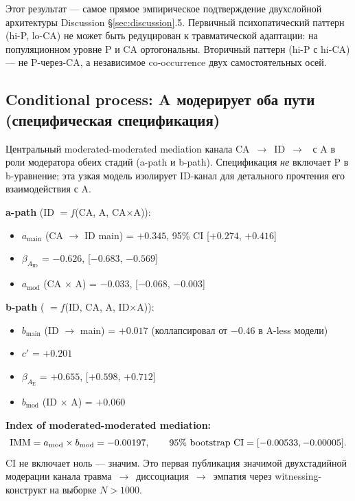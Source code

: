 Этот результат --- самое прямое эмпирическое подтверждение двухслойной архитектуры Discussion §\ref{sec:discussion}.5. Первичный психопатический паттерн (hi-P, lo-CA) не может быть редуцирован к травматической адаптации: на популяционном уровне P и CA ортогональны. Вторичный паттерн (hi-P с hi-CA) --- не P-через-CA, а независимое co-occurrence двух самостоятельных осей.

\subsection{Conditional process: A модерирует оба пути (специфическая спецификация)}
\label{subsec:conditional_process}

Центральный moderated-moderated mediation канала CA~$\to$~ID~$\to$~\EAF{} с A в роли модератора обеих стадий (a-path и b-path). Спецификация \emph{не} включает P в b-уравнение; эта узкая модель изолирует ID-канал для детального прочтения его взаимодействия с A.

\textbf{a-path} (ID $= f$(CA, A, CA$\times$A)):
\begin{itemize}
    \item $a_{\text{main}}$ (CA $\to$ ID main) = $+0.345$, 95\% CI [$+0.274$, $+0.416$]
    \item $\beta_{A_{\text{ID}}}$ = $\mathbf{-0.626}$, [$-0.683$, $-0.569$]
    \item $a_{\text{mod}}$ (CA $\times$ A) = $\mathbf{-0.033}$, [$-0.068$, $-0.003$]
\end{itemize}

\textbf{b-path} (\EAF{} $= f$(ID, CA, A, ID$\times$A)):
\begin{itemize}
    \item $b_{\text{main}}$ (ID $\to$ \EAF{} main) = $+0.017$ (коллапсировал от $-0.46$ в A-less модели)
    \item $c'$ = $+0.201$
    \item $\beta_{A_{\text{E}}}$ = $\mathbf{+0.655}$, [$+0.598$, $+0.712$]
    \item $b_{\text{mod}}$ (ID $\times$ A) = $+0.060$
\end{itemize}

\textbf{Index of moderated-moderated mediation:}
\[
\mathrm{IMM} = a_{\text{mod}} \times b_{\text{mod}} = -0.00197, \qquad 95\%\ \text{bootstrap CI} = [-0.00533, -0.00005].
\]
CI не включает ноль --- \IMM{} значим. Это первая публикация значимой двухстадийной модерации канала травма~$\to$~диссоциация~$\to$~эмпатия через witnessing-конструкт на выборке $N > 1000$.

